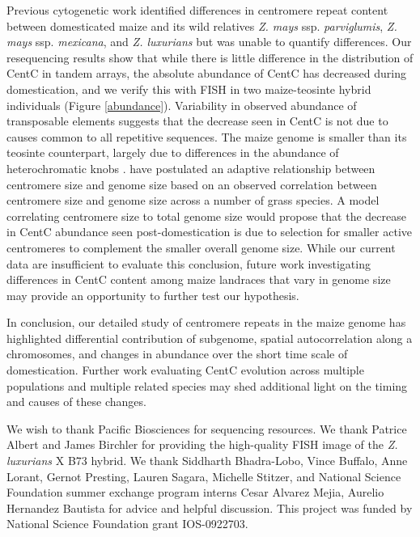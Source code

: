 Previous cytogenetic work  identified  differences in centromere repeat content  between domesticated maize and its wild relatives \emph{Z. mays} ssp. \emph{parviglumis}, \emph{Z. mays} ssp. \emph{mexicana}, and \emph{Z. luxurians}  \citep{Albert2010} but was unable to quantify  differences. 
Our resequencing results show that while there is little difference in the distribution of CentC in tandem arrays, the absolute abundance of CentC has  decreased during domestication, and we verify this with FISH in two maize-teosinte hybrid individuals (Figure \ref{abundance}). 
Variability in observed abundance of transposable elements \citep{Chia2012} suggests that the decrease seen in CentC is not due to causes common to all repetitive sequences.
The maize genome is smaller than its teosinte counterpart, largely due to differences in the abundance of heterochromatic knobs \citep{poggio1998}.  
\citet{Zhang2012} have postulated an adaptive relationship between centromere size and genome size based on an observed correlation between centromere size and genome size across a number of grass species.  
A model correlating centromere size to total genome size would propose that the decrease in CentC abundance seen post-domestication is due to selection for smaller active centromeres to complement the smaller overall genome size.
While our current data are insufficient to evaluate this conclusion, future work investigating differences in CentC content among maize landraces that vary in genome size \citep{poggio1998} may provide an opportunity to further test our hypothesis.  

In conclusion, our detailed study of centromere repeats in the maize genome has highlighted differential contribution of subgenome, spatial autocorrelation along a chromosomes, and changes in abundance over the short time scale of domestication.  
Further work evaluating CentC evolution across multiple populations and multiple related species may shed additional light on the timing and causes of these changes.  

\begin{acknowledgements}
We wish to thank Pacific Biosciences for sequencing resources.  We thank Patrice Albert and James Birchler for providing the high-quality FISH image of the \emph{Z. luxurians} X B73 hybrid.  We thank Siddharth Bhadra-Lobo, Vince Buffalo, Anne Lorant, Gernot Presting, Lauren Sagara, Michelle Stitzer, and National Science Foundation summer exchange program interns Cesar Alvarez Mejia, Aurelio Hernandez Bautista for advice and helpful discussion. This project was funded by National Science Foundation grant IOS-0922703.
\end{acknowledgements}

